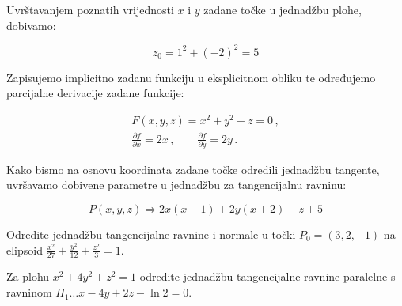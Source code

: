 Uvrštavanjem poznatih vrijednosti $x$ i $y$ zadane točke u jednadžbu plohe, dobivamo:

$$
z_0 = 1^2 + (-2)^2 = 5
$$

Zapisujemo implicitno zadanu funkciju u eksplicitnom obliku te određujemo parcijalne derivacije zadane funkcije:

\begin{gather*}
  F(x, y, z) = x^2 + y^2 - z = 0\,,\\
  \frac{\partial f}{\partial x} = 2x\,, \qquad \frac{\partial f}{\partial y} = 2y\,.
\end{gather*}

Kako bismo na osnovu koordinata zadane točke odredili jednadžbu tangente, uvršavamo dobivene parametre u jednadžbu za tangencijalnu ravninu:

$$
P(x, y, z) \Rightarrow 2x(x - 1) + 2y(x + 2) - z + 5
$$

\begin{example}
  Odredite jednadžbu tangencijalne ravnine i normale u točki $P_0 = (3,2,-1)$ na
  elipsoid $\displaystyle \frac{x^2}{27}+\frac{y^2}{12}+\frac{z^2}{3}=1$.
\end{example}

\begin{example}
  Za plohu $x^2+4y^2+z^2=1$ odredite jednadžbu tangencijalne ravnine paralelne s
  ravninom $\Pi_1\dots x-4y+2z-\ln 2 = 0$.
\end{example}